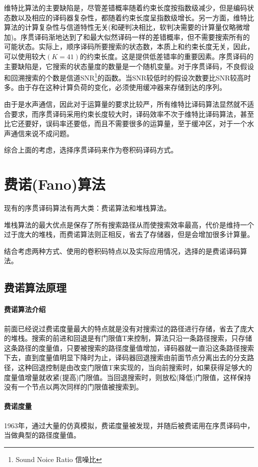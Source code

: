 维特比算法的主要缺陷是，尽管差错概率随着约束长度按指数级减少，但是编码状态数以及相应的译码器复杂性，都随着约束长度呈指数级增长。另一方面，维特比算法的计算复杂性与信道特性无关(和硬判决相比，软判决需要的计算量仅略微增加)。序贯译码渐地达到了和最大似然译码一样的差错概率，但不需要搜索所有的可能状态。实际上，顺序译码所要搜索的状态数，本质上和约束长度无关，因此，可以使用较大$(K=41)$的约束长度。这是提供低差错率的重要因素。序贯译码的主要缺陷是，它搜索的状态量度的数量是一个随机变量。对于序贯译码，不良假设和回溯搜索的个数是信道SNR\footnote{Sound
Noice Ratio
信噪比}的函数。当SNR较低时的假设次数要比SNR较高时多。由于存在这种计算负荷的变化，必须使用缓冲器来存储到达的序列。

由于是水声通信，因此对于运算量的要求比较严，所有维特比译码算法显然就不适合要求，而序贯译码采用约束长度较大时，译码效率不次于维特比译码算法，甚至比它还要好，误码率还要低，而且不需要很多的运算量，至于缓冲区，对于一个水声通信来说不成问题。

综合上面的考虑，选择序贯译码\cite{Anderson_fano}来作为卷积码译码方式。
\section{费诺(Fano)算法}
现有的序贯译码算法有两大类：费诺算法和堆栈算法\cite{Geist_fano}。

堆栈算法的最大优点是保存了所有搜索路径从而使搜索效率最高，代价是维持一个过于庞大的堆栈，而费诺算法则正相反，省去了存储器，但是会增加很多计算量。

结合考虑两种方式、使用的卷积码特点以及实际应用情况，选择的是费诺译码算法。
\subsection{费诺算法原理}
\paragraph*{费诺算法介绍\cite{SunJun_fano}}
前面已经说过费诺度量最大的特点就是没有对搜索过的路径进行存储，省去了庞大的堆栈。搜索的前进和回退是有门限值T来控制，算法只沿一条路径搜索，只存储这条路径的度量值，只要被搜索的路径度量值增加，译码器就一直沿这条路径搜索下去，直到度量值明显下降时为止，译码器回退搜索由前面节点分离出去的分支路径，这种回退控制是由改变门限值T来实现的，当向前搜索时，如果获得足够大的度量值增量就收紧(提高)门限值。当回退搜索时，则放松(降低)门限值，这样保持没有一个节点以两次同样的门限值被搜索到\cite{Forney_fano}。
\paragraph*{费诺度量\cite{Han_fano}}
1963年，通过大量的仿真模拟，费诺度量被发现，并随后被费诺用在序贯译码中\cite{ROBERT_FANO}，当做典型的路径度量值。

